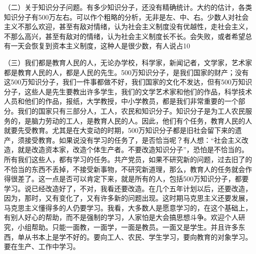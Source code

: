 （二）关于知识分子问题。有多少知识分子，还没有精确统计。大约的估计，各类知识分子有500万左右。可以作个粗略的分析，无非是左、中、右。少数人对社会主义不那么欢迎，甚至有敌对情绪，认为社会主义制度没有优越性，走社会主义，不那么高兴，甚至有敌对的情绪，认为社会主义制度长不长。会失败，或者希望总有一天会恢复到资本主义制度，这种人是很少数，有人说占10%

（三）我们都是教育人民的人，无论办学校，科学家，新闻记者，文学家，艺术家都是教育人民的人，都是人民的先生。500万知识分子，是我们国家的财产；没有这500万知识分子，我们一件事都做不好，我们国家的文化不发达，但有500万知识分子，这些人是先生要教出许多学生，我们的文学艺术家和他们的作品，科学技术人员和他们的作品，报纸，大学教授，中小学教员，都是我们非常重要的一个部分。我们的国家只有三部分人，工人，农民和知识分子。知识分子是为工人农民服务的，是脑力劳动的工人，是教育人民的人。因此，他们有个任务，教育人民的人就要先受教育。尤其是在大变动的时期，500万知识分子都是旧社会留下来的遗产，须接受教育。如果说没有学习的任务了，是否恰当呢？有人想：“社会主义改造，就是改造资本家，改造个体生产者。不要改造知识分子”，恐怕是不恰当的。所有我们这些人，都有学习的任务。共产党员，如果不研究新的问题，过去旧了的不恰当的东西不丢掉，不接受新事物，不研究新道理，那么，教育人的任务就会作得很差了。这一点是否可以肯定下来，就是所有的人，包括500万知识分子，都要学习。说已经改造好了，不对，我看还要改造。在几个五年计划以后，还要改造，因为，那时，又有变化了，又有许多新的问题出现。这时期马克思主义还要发展，马克思主义懂得多的人仍要学习。我看，大多数人是愿意学习的，在这个基础上，有别人好心的帮助，而不是强制的学习，人家怕是大会搞思想斗争。欢迎个人研究，小组帮助。只能一面教，一面学，一面是教员。一面又是学生。并且许多东西，单从书本上是学不好的。要向工人、农民、学生学习，要向教育的对象学习。要在生产、工作中学习。

